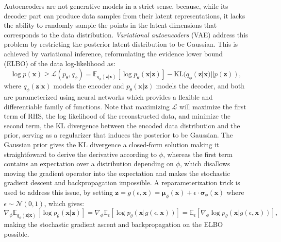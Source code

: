 Autoencoders are not generative models in a strict sense, because, while its decoder part can produce data samples from their latent representations, it lacks the ability to randomly sample the points in the latent dimensions that corresponds to the data distribution.
\emph{Variational autoencoders} (VAE) \cite{kingma2013vae} address this problem by restricting the posterior latent distribution to be Gaussian.
This is achieved by variational inference, reformulating the evidence lower bound (ELBO) of the data log-likelihood as:
\begin{equation}\label{eqn:vae}
\log p(\bm{x}) \ge \mathcal{L}(p_\theta, q_\phi) = \mathbb{E}_{q_\phi(\bm{z}|\bm{x})} [\log p_\theta(\bm{x}|\bm{z})] - \mathrm{KL}(q_\phi(\bm{z}|\bm{x}) || p(\bm{z})),
\end{equation}
where $q_\phi(\bm{z}|\bm{x})$ models the encoder and $p_\theta(\bm{x}|\bm{z})$ models the decoder, and both are parameterized using neural networks which provides a flexible and differentiable family of functions.
Note that maximizing $\mathcal{L}$ will maximize the first term of RHS, the log likelihood of the reconstructed data, and minimize the second term, the KL divergence between the encoded data distribution and the prior, serving as a regularizer that induces the posterior to be Gaussian.
The Gaussian prior gives the KL divergence a closed-form solution making it straightfoward to derive the derivative according to $\phi$, whereas the first term contains an expectation over a distribution depending on $\phi$, which disallows moving the gradient operator into the expectation and makes the stochastic gradient descent and backpropagation impossible.
A reparameterization trick is used to address this issue, by setting $\bm{z} = g({\epsilon}, \bm{x}) = \bm{\mu}_\phi (\bm{x}) + {\epsilon} \cdot \bm{\sigma}_\phi(\bm{x})$ where $\epsilon \sim \mathcal{N}(0, 1)$, which gives:
\begin{equation}\label{eqn:reparam}
\nabla_\phi \mathbb{E}_{q_\phi(\bm{z}|\bm{x})} [\log p_\theta(\bm{x}|\bm{z})] = \nabla_\phi \mathbb{E}_{\epsilon} [\log p_\theta(\bm{x}|g(\epsilon, \bm{x}))] = 
\mathbb{E}_{\epsilon} [\nabla_\phi \log p_\theta(\bm{x}|g(\epsilon, \bm{x}))],
\end{equation}
making the stochastic gradient ascent and backpropagation on the ELBO possible.


